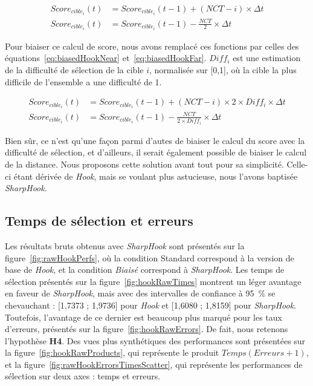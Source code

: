 	\begin{align}
		\label{eq:standardHookNear}
		Score_{cible_{i}}(t) &= Score_{cible_{i}}(t-1) + (NCT - i) \times \Delta{}t \\
		\label{eq:standardHookFar}
		Score_{cible_{i}}(t) &= Score_{cible_{i}}(t-1) - \frac{NCT}{2} \times \Delta{}t
	\end{align}
	
	Pour biaiser ce calcul de score, nous avons remplacé ces fonctions par celles des équations~\ref{eq:biasedHookNear} et~\ref{eq:biasedHookFar}. $Diff_{i}$ est une estimation de la difficulté de sélection de la cible $i$, normalisée sur [0,1], où la cible la plus difficile de l'ensemble a une difficulté de 1.

	\begin{align}
		\label{eq:biasedHookNear}
		Score_{cible_{i}}(t) &= Score_{cible_{i}}(t-1) + (NCT - i) \times 2 \times Diff_{i} \times \Delta{}t \\
		\label{eq:biasedHookFar}
		Score_{cible_{i}}(t) &= Score_{cible_{i}}(t-1) - \frac{NCT}{2\times Diff_{i}} \times \Delta{}t
	\end{align}
	
	Bien sûr, ce n'est qu'une façon parmi d'autes de biaiser le calcul du score avec la difficulté de sélection, et d'ailleurs, il serait également possible de biaiser le calcul de la distance. Nous proposons cette solution avant tout pour sa simplicité. Celle-ci étant dérivée de \emph{Hook}, mais se voulant plus astucieuse, nous l'avons baptisée \emph{SharpHook}.
	
	\subsection{Temps de sélection et erreurs}
	Les résultats bruts obtenus avec \emph{SharpHook} sont présentés sur la figure~\ref{fig:rawHookPerfs}, où la condition \og Standard \fg{} correspond à la version de base de \emph{Hook}, et la condition \emph{Biaisé} correspond à \emph{SharpHook}. Les temps de sélection présentés sur la figure~\ref{fig:hookRawTimes} montrent un léger avantage en faveur de \emph{SharpHook}, mais avec des intervalles de confiance à 95~\%{} se chevauchant : [1,7373 ; 1,9736] pour \emph{Hook} et [1,6080 ; 1,8159] pour \emph{SharpHook}. Toutefois, l'avantage de ce dernier est beaucoup plus marqué pour les taux d'erreurs, présentés sur la figure~\ref{fig:hookRawErrors}. De fait, nous retenons l'hypothèse \textbf{H4}. Des vues plus synthétiques des performances sont présentées sur la figure~\ref{fig:hookRawProducts}, qui représente le produit $Temps(Erreurs+1)$, et la figure~\ref{fig:rawHookErrorsTimesScatter}, qui représente les performances de sélection sur deux axes : temps et erreurs.
	
